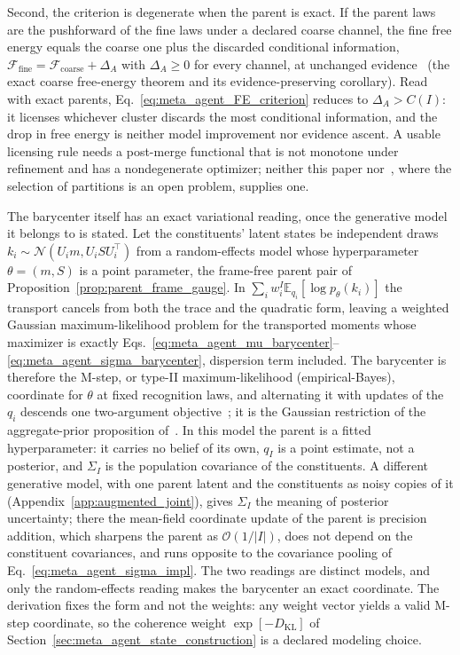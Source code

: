 Second, the criterion is degenerate when the parent is exact. If the parent laws are the pushforward of the fine laws under a declared coarse channel, the fine free energy equals the coarse one plus the discarded conditional information, $\mathcal{F}_{\mathrm{fine}} = \mathcal{F}_{\mathrm{coarse}} + \Delta_A$ with $\Delta_A \ge 0$ for every channel, at unchanged evidence~\cite[Ch.~9]{DennisGaugeVFE2026} (the exact coarse free-energy theorem and its evidence-preserving corollary). Read with exact parents, Eq.~\eqref{eq:meta_agent_FE_criterion} reduces to $\Delta_A > C(I)$: it licenses whichever cluster discards the most conditional information, and the drop in free energy is neither model improvement nor evidence ascent. A usable licensing rule needs a post-merge functional that is not monotone under refinement and has a nondegenerate optimizer; neither this paper nor~\cite[Ch.~9]{DennisGaugeVFE2026}, where the selection of partitions is an open problem, supplies one.

The barycenter itself has an exact variational reading, once the generative model it belongs to is stated. Let the constituents' latent states be independent draws $k_i \sim \mathcal{N}(U_i m, U_i S U_i^\top)$ from a random-effects model whose hyperparameter $\theta = (m, S)$ is a point parameter, the frame-free parent pair of Proposition~\ref{prop:parent_frame_gauge}. In $\sum_i w_i^I \mathbb{E}_{q_i}[\log p_\theta(k_i)]$ the transport cancels from both the trace and the quadratic form, leaving a weighted Gaussian maximum-likelihood problem for the transported moments whose maximizer is exactly Eqs.~\eqref{eq:meta_agent_mu_barycenter}--\eqref{eq:meta_agent_sigma_barycenter}, dispersion term included. The barycenter is therefore the M-step, or type-II maximum-likelihood (empirical-Bayes), coordinate for $\theta$ at fixed recognition laws, and alternating it with updates of the $q_i$ descends one two-argument objective~\cite{Neal1998}; it is the Gaussian restriction of the aggregate-prior proposition of~\cite[Ch.~12]{DennisGaugeVFE2026}. In this model the parent is a fitted hyperparameter: it carries no belief of its own, $q_I$ is a point estimate, not a posterior, and $\Sigma_I$ is the population covariance of the constituents. A different generative model, with one parent latent and the constituents as noisy copies of it (Appendix~\ref{app:augmented_joint}), gives $\Sigma_I$ the meaning of posterior uncertainty; there the mean-field coordinate update of the parent is precision addition, which sharpens the parent as $\mathcal{O}(1/|I|)$, does not depend on the constituent covariances, and runs opposite to the covariance pooling of Eq.~\eqref{eq:meta_agent_sigma_impl}. The two readings are distinct models, and only the random-effects reading makes the barycenter an exact coordinate. The derivation fixes the form and not the weights: any weight vector yields a valid M-step coordinate, so the coherence weight $\exp[-D_{\mathrm{KL}}]$ of Section~\ref{sec:meta_agent_state_construction} is a declared modeling choice.

